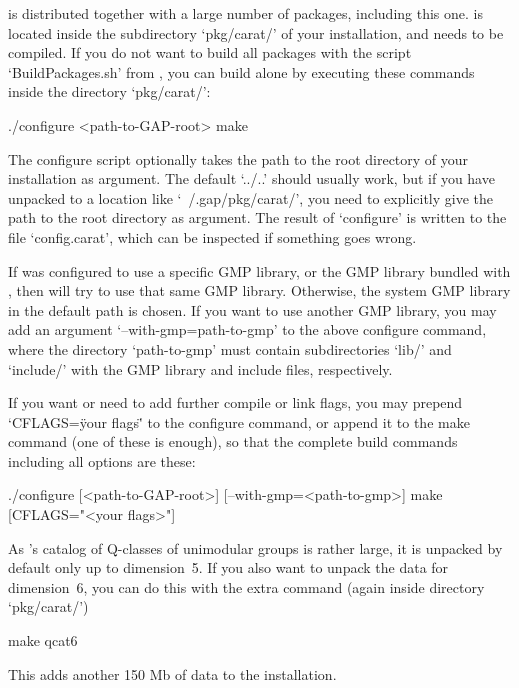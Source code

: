 
{\GAP} is distributed together with a large number of packages, including
this one. {\Carat} is located inside the subdirectory `pkg/carat/' of your 
{\GAP} installation, and needs to be compiled. If you do not want to build 
all packages with the script `BuildPackages.sh' from {\GAP}, you can build 
{\Carat} alone by executing these commands inside the directory `pkg/carat/':

\begintt
./configure <path-to-GAP-root>
make
\endtt

The configure script optionally takes the path to the root directory of 
your {\GAP} installation as argument. The default `../..' should usually 
work, but if you have unpacked {\Carat} to a location like `~/.gap/pkg/carat/', 
you need to explicitly give the path to the {\GAP} root directory as argument.
The result of `configure' is written to the file `config.carat', which can be
inspected if something goes wrong.

If {\GAP} was configured to use a specific GMP library, or the GMP library
bundled with {\GAP}, then {\CARAT} will try to use that same GMP library.
Otherwise, the system GMP library in the default path is chosen. If you want
to use another GMP library, you may add an argument `--with-gmp=path-to-gmp'
to the above configure command, where the directory `path-to-gmp' must
contain subdirectories `lib/' and `include/' with the GMP library and include
files, respectively.

If you want or need to add further compile or link flags, you may prepend
`CFLAGS=\"your flags\"' to the configure command, or append it to the make
command (one of these is enough), so that the complete build commands
including all options are these:

\begintt
 [CFLAGS="<your flags>"] ./configure [<path-to-GAP-root>] [--with-gmp=<path-to-gmp>]
 make [CFLAGS="<your flags>"]
\endtt

As {\CARAT}'s catalog of Q-classes of unimodular groups is rather large,
it is unpacked by default only up to dimension~5. If you also want
to unpack the data for dimension~6, you can do this with the extra
command (again inside directory `pkg/carat/')

\begintt
make qcat6
\endtt

This adds another 150 Mb of data to the installation.
